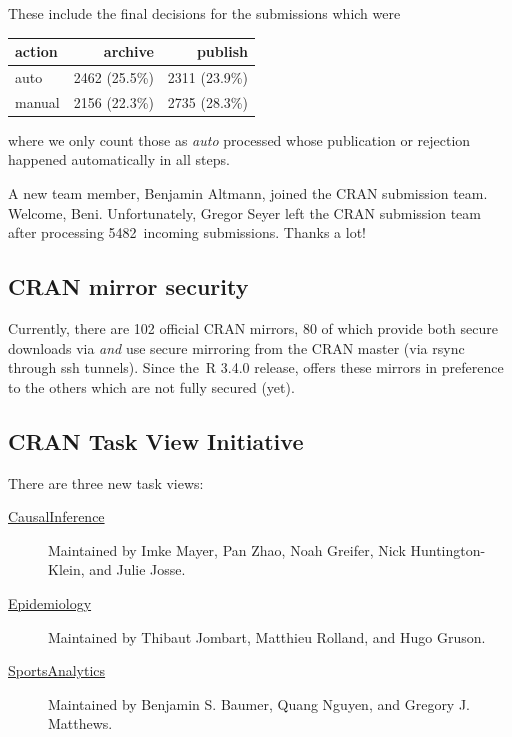 These include the final decisions for the submissions which were
\begin{center}
\begin{tabular}{l|rr}
action & archive        & publish\\ \hline
auto   &  2462 (25.5\%) & 2311 (23.9\%)\\
manual &  2156 (22.3\%) & 2735 (28.3\%)
\end{tabular}
\end{center}
where we only count those as \emph{auto} processed whose publication or
rejection happened automatically in all steps.

A new team member, Benjamin Altmann, joined the CRAN submission team. 
Welcome, Beni.
Unfortunately, Gregor Seyer left the CRAN submission team after 
processing 5482~incoming submissions. Thanks a lot!

\subsection{CRAN mirror security}


Currently, there are 102 official CRAN mirrors, 80 of which provide both
secure downloads via  \emph{and} use secure mirroring from
the CRAN master (via rsync through ssh tunnels).  Since the~R 3.4.0
release,  offers these mirrors in preference to
the others which are not fully secured (yet).

\subsection{CRAN Task View Initiative}

There are three new task views:
\begin{description}
 \item[\href{https://CRAN.R-project.org/view=CausalInference}{CausalInference}]
  Maintained by Imke Mayer, Pan Zhao, Noah Greifer,
  Nick Huntington-Klein, and Julie Josse.
 \item[\href{https://CRAN.R-project.org/view=Epidemiology}{Epidemiology}]
  Maintained by Thibaut Jombart, Matthieu Rolland, and Hugo Gruson.
 \item[\href{https://CRAN.R-project.org/view=SportsAnalytics}{SportsAnalytics}]
  Maintained by Benjamin S. Baumer, Quang Nguyen, and Gregory J. Matthews.
\end{description}

